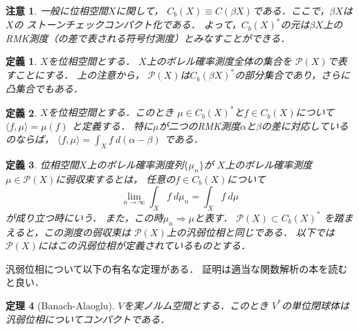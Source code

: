 \documentclass[leqno, a4paper, 12pt]{jsarticle}
\newtheorem{thm}{定理}
\newtheorem{df}[thm]{定義}
\newtheorem*{rmk}{注意}
\newcommand{\To}{\Longrightarrow}
\begin{document}
\begin{rmk}
一般に位相空間$X$に関して，
$C_b(X)\equiv C(\beta X)$である．ここで，$\beta X$は$X$の
ストーンチェックコンパクト化である．
よって，$C_b(X)^*$の元は$\beta X$上の
RMK測度（の差で表される符号付測度）とみなすことができる．
\end{rmk}



\begin{df}
$X$を位相空間とする．
$X$上のボレル確率測度全体の集合を
$\mathcal{P}(X)$で表すことにする．
上の注意から，
$\mathcal{P}(X)$は$C_{b}(\beta X)^{*}$の部分集合であり，さらに凸集合でもある．
\end{df}

\begin{df}
$X$を位相空間とする．このとき
$\mu\in C_{b}(X)^{*}$と$f\in C_{b}(X)$について
$\langle f, \mu \rangle =\mu(f)$
と定義する．
特に$\mu$が二つのRMK測度$\alpha$と$\beta$の差に対応しているのならば，
$\langle f, \mu\rangle =\int_{X}f\  d(\alpha-\beta)$
である．
\end{df}


\begin{df}
位相空間$X$上のボレル確率測度列$\{\mu_n\}$が
$X$上のボレル確率測度$\mu\in \mathcal{P}(X)$に弱収束するとは，
任意の$f\in C_b(X)$について
\[
\lim_{n\to \infty}\int_Xf\ d\mu_n=\int_{X} f\  d\mu
\]
が成り立つ時にいう．
また，この時$\mu_n\To \mu$と表す．
$\mathcal{P}(X)\subset C_{b}(X)^{*}$
を踏まえると，この測度の弱収束は
$\mathcal{P}(X)$上の汎弱位相と同じである．
以下では$\mathcal{P}(X)$にはこの汎弱位相が定義されているものとする．
\end{df}

汎弱位相について以下の有名な定理がある．
証明は適当な関数解析の本を読むと良い．
\begin{thm}[Banach-Alaoglu]\label{thm:ba}
$V$を実ノルム空間とする．このとき
$V^{*}$の単位閉球体は汎弱位相についてコンパクトである．
\end{thm}
\end{document}
